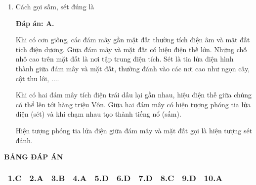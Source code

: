 \begin{enumerate}[label=\bfseries Câu \arabic*:]
{		Đặc tuyến Vôn-Ampe trong quá trình dẫn điện của chất khí không phải đường thẳng, nên $U$ và $I$ không tỉ lệ thuận với nhau. Do đó, quá trình dẫn điện không tự lực không tuân theo định luật Ôm.
	}
	\item {}
	
	\cauhoi
	{Cách gọi sấm, sét đúng là
		
	}
	\loigiai
	{	\textbf{Đáp án: A.}
		
		Khi có cơn giông, các đám mây gần mặt đất thường tích điện âm và mặt đất tích điện dương. Giữa đám mây và mặt đất có hiệu điện thế lớn. Những chỗ nhô cao trên mặt đất là nơi tập trung điện tích. Sét là tia lửa điện hình thành giữa đám mây và mặt đất, thường đánh vào các nơi cao như ngọn cây, cột thu lôi, $\ldots$.
		
		Khi có hai đám mây tích điện trái dấu lại gần nhau, hiệu điện thế giữa chúng có thể lên tới hàng triệu Vôn. Giữa hai đám mây có hiện tượng phóng tia lửa điện (sét) và khi chạm nhau tạo thành tiếng nổ (sấm).
		
		Hiện tượng phóng tia lửa điện giữa đám mây và mặt đất gọi là hiện tượng sét đánh.
	}
\end{enumerate}

\whiteBGstarEnd

\loigiai
{
	\begin{center}
		\textbf{BẢNG ĐÁP ÁN}
	\end{center}
	\begin{center}
		\begin{tabular}{|m{2.8em}|m{2.8em}|m{2.8em}|m{2.8em}|m{2.8em}|m{2.8em}|m{2.8em}|m{2.8em}|m{2.8em}|m{2.8em}|}
			\hline
			1.C  & 2.A  & 3.B  & 4.A  & 5.D  & 6.D  & 7.D  & 8.C  & 9.D  & 10.A  \\
			\hline
			
		\end{tabular}
	\end{center}
}
